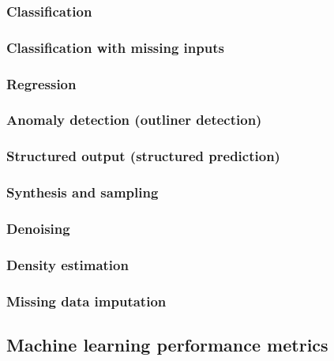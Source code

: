 \subsubsection{Classification}

\subsubsection{Classification with missing inputs}

\subsubsection{Regression}

\subsubsection{Anomaly detection (outliner detection)}

\subsubsection{Structured output (structured prediction)}

\subsubsection{Synthesis and sampling}

\subsubsection{Denoising}

\subsubsection{Density estimation}

\subsubsection{Missing data imputation}


\subsection{Machine learning performance metrics}


